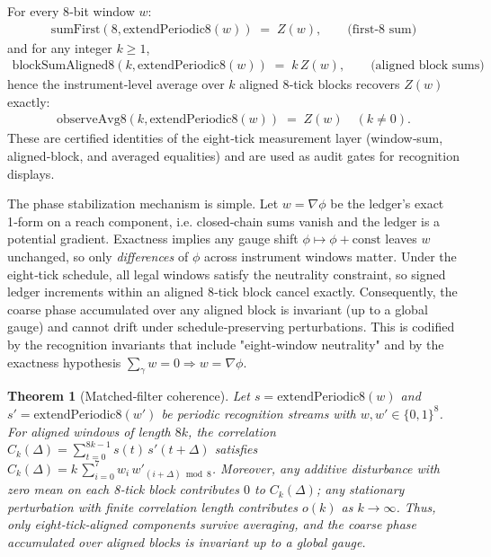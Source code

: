 \documentclass[12pt,a4paper]{article}
\newtheorem{theorem}{Theorem}[section]
\theoremstyle{definition}
\theoremstyle{remark}
\begin{document}
For every 8‑bit window \(w\):
\begin{align}
\mathrm{sumFirst}\!\left(8,\mathrm{extendPeriodic8}(w)\right) \;=\; Z(w), \qquad\text{(first‑8 sum)} \tag{4.1} \label{eq:first8}
\end{align}
and for any integer \(k\ge 1\),
\begin{align}
\mathrm{blockSumAligned8}\!\left(k,\mathrm{extendPeriodic8}(w)\right) \;=\; k\,Z(w), \qquad\text{(aligned block sums)} \tag{4.2} \label{eq:blocksum}
\end{align}
hence the instrument‑level average over \(k\) aligned 8‑tick blocks recovers \(Z(w)\) exactly:
\begin{align}
\mathrm{observeAvg8}\!\left(k,\mathrm{extendPeriodic8}(w)\right) \;=\; Z(w) \quad (k\neq 0). \tag{4.3} \label{eq:avg8}
\end{align}
These are certified identities of the eight‑tick measurement layer (window‑sum, aligned‑block, and averaged equalities) and are used as audit gates for recognition displays.

The phase stabilization mechanism is simple. Let \(w=\nabla \phi\) be the ledger's exact 1‑form on a reach component, i.e. closed‑chain sums vanish and the ledger is a potential gradient. Exactness implies any gauge shift \(\phi\mapsto \phi+\mathrm{const}\) leaves \(w\) unchanged, so only \emph{differences} of \(\phi\) across instrument windows matter. Under the eight‑tick schedule, all legal windows satisfy the neutrality constraint, so signed ledger increments within an aligned 8‑tick block cancel exactly. Consequently, the coarse phase accumulated over any aligned block is invariant (up to a global gauge) and cannot drift under schedule‑preserving perturbations. This is codified by the recognition invariants that include "eight‑window neutrality" and by the exactness hypothesis \(\sum_{\gamma}w=0\Rightarrow w=\nabla\phi\).
\begin{theorem}[Matched‑filter coherence]
Let $s=\mathrm{extendPeriodic8}(w)$ and \\
$s'=\mathrm{extendPeriodic8}(w')$ be periodic recognition streams with $w,w'\in\{0,1\}^8$. For aligned windows of length $8k$, the correlation $C_k(\Delta)=\sum_{t=0}^{8k-1} s(t)\,s'(t+\Delta)$ satisfies $C_k(\Delta)=k\,\sum_{i=0}^{7} w_i\,w'_{(i+\Delta)\bmod 8}$. Moreover, any additive disturbance with zero mean on each 8‑tick block contributes $0$ to $C_k(\Delta)$; any stationary perturbation with finite correlation length contributes $o(k)$ as $k\to\infty$. Thus, only eight‑tick‑aligned components survive averaging, and the coarse phase accumulated over aligned blocks is invariant up to a global gauge.
\end{theorem}
\end{document}
